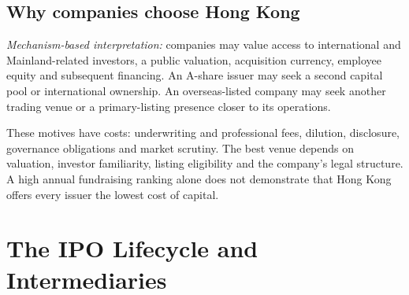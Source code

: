 \documentclass[11pt,a4paper]{article}
\begin{document}
\subsection{Why companies choose Hong Kong}
\textit{Mechanism-based interpretation:} companies may value access to international and Mainland-related investors, a public valuation, acquisition currency, employee equity and subsequent financing. An A-share issuer may seek a second capital pool or international ownership. An overseas-listed company may seek another trading venue or a primary-listing presence closer to its operations.

These motives have costs: underwriting and professional fees, dilution, disclosure, governance obligations and market scrutiny. The best venue depends on valuation, investor familiarity, listing eligibility and the company's legal structure. A high annual fundraising ranking alone does not demonstrate that Hong Kong offers every issuer the lowest cost of capital.

\section{The IPO Lifecycle and Intermediaries}
\end{document}
